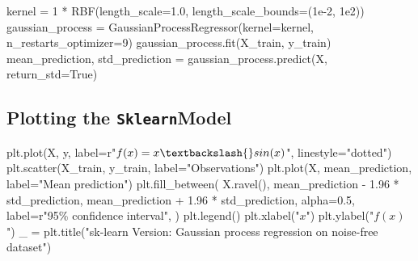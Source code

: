 \documentclass[
  letterpaper,
  DIV=11,
  numbers=noendperiod]{scrreprt}
\newenvironment{Shaded}{\begin{snugshade}}{\end{snugshade}}
\newcommand{\DecValTok}[1]{\textcolor[rgb]{0.68,0.00,0.00}{#1}}
\newcommand{\FloatTok}[1]{\textcolor[rgb]{0.68,0.00,0.00}{#1}}
\newcommand{\NormalTok}[1]{\textcolor[rgb]{0.00,0.23,0.31}{#1}}
\newcommand{\OperatorTok}[1]{\textcolor[rgb]{0.37,0.37,0.37}{#1}}
\newcommand{\SpecialCharTok}[1]{\textcolor[rgb]{0.37,0.37,0.37}{#1}}
\newcommand{\StringTok}[1]{\textcolor[rgb]{0.13,0.47,0.30}{#1}}
\newcommand{\VariableTok}[1]{\textcolor[rgb]{0.07,0.07,0.07}{#1}}
\newcommand{\VerbatimStringTok}[1]{\textcolor[rgb]{0.13,0.47,0.30}{#1}}
\begin{document}
\begin{Shaded}
\begin{Highlighting}[]
\NormalTok{kernel }\OperatorTok{=} \DecValTok{1} \OperatorTok{*}\NormalTok{ RBF(length\_scale}\OperatorTok{=}\FloatTok{1.0}\NormalTok{, length\_scale\_bounds}\OperatorTok{=}\NormalTok{(}\FloatTok{1e{-}2}\NormalTok{, }\FloatTok{1e2}\NormalTok{))}
\NormalTok{gaussian\_process }\OperatorTok{=}\NormalTok{ GaussianProcessRegressor(kernel}\OperatorTok{=}\NormalTok{kernel, n\_restarts\_optimizer}\OperatorTok{=}\DecValTok{9}\NormalTok{)}
\NormalTok{gaussian\_process.fit(X\_train, y\_train)}
\NormalTok{mean\_prediction, std\_prediction }\OperatorTok{=}\NormalTok{ gaussian\_process.predict(X, return\_std}\OperatorTok{=}\VariableTok{True}\NormalTok{)}
\end{Highlighting}
\end{Shaded}

\hypertarget{plotting-the-sklearnmodel}{%
\subsection{\texorpdfstring{Plotting the
\texttt{Sklearn}Model}{Plotting the SklearnModel}}\label{plotting-the-sklearnmodel}}

\begin{Shaded}
\begin{Highlighting}[]
\NormalTok{plt.plot(X, y, label}\OperatorTok{=}\VerbatimStringTok{r"$f(x) = x \textbackslash{}sin(x)$"}\NormalTok{, linestyle}\OperatorTok{=}\StringTok{"dotted"}\NormalTok{)}
\NormalTok{plt.scatter(X\_train, y\_train, label}\OperatorTok{=}\StringTok{"Observations"}\NormalTok{)}
\NormalTok{plt.plot(X, mean\_prediction, label}\OperatorTok{=}\StringTok{"Mean prediction"}\NormalTok{)}
\NormalTok{plt.fill\_between(}
\NormalTok{    X.ravel(),}
\NormalTok{    mean\_prediction }\OperatorTok{{-}} \FloatTok{1.96} \OperatorTok{*}\NormalTok{ std\_prediction,}
\NormalTok{    mean\_prediction }\OperatorTok{+} \FloatTok{1.96} \OperatorTok{*}\NormalTok{ std\_prediction,}
\NormalTok{    alpha}\OperatorTok{=}\FloatTok{0.5}\NormalTok{,}
\NormalTok{    label}\OperatorTok{=}\VerbatimStringTok{r"95}\SpecialCharTok{\% c}\VerbatimStringTok{onfidence interval"}\NormalTok{,}
\NormalTok{)}
\NormalTok{plt.legend()}
\NormalTok{plt.xlabel(}\StringTok{"$x$"}\NormalTok{)}
\NormalTok{plt.ylabel(}\StringTok{"$f(x)$"}\NormalTok{)}
\NormalTok{\_ }\OperatorTok{=}\NormalTok{ plt.title(}\StringTok{"sk{-}learn Version: Gaussian process regression on noise{-}free dataset"}\NormalTok{)}
\end{Highlighting}
\end{Shaded}
\end{document}
